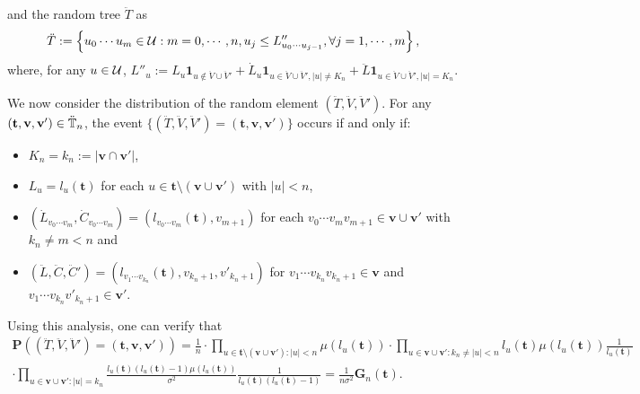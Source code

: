\documentclass[12pt]{amsart}
\theoremstyle{remark}
\numberwithin{equation}{section}
\newcommand{\ind}[1]{\mathbf 1_{#1}}
\newcommand{\prob}{\mathbf P}
\newcommand{\norm}[1]{\left\| #1 \right\|}
\newcommand{\abs}[1]{\left| #1 \right|}
\newcommand{\set}[1]{\left\{ #1 \right\}}
\newcommand{\tree}{\mathbf t}
\newcommand{\spine}{\mathbf v}
\newcommand{\bG}{\mathbf G}\newcommand{\bbG}{\mathbb G}\newcommand{\cG}{\mathcal G}
\begin{document}
and the random tree $\ddot T$ as
\begin{equation*}
	    \ddot T
	:=
          \set{u_0\cdots u_m\in\cU: m=0,\cdots,n,u_j\leq L''_{u_0\cdots u_{j-1}},\forall j=1,\cdots,m},
\end{equation*}
	where, for any $u\in\mathcal U$, $L''_u:=L_u \ind{u\not\in \ddot V\cup\ddot V'}+\dot L_u \ind{u\in \ddot V\cup\ddot V',|u|\neq K_n}+\ddot L\ind{u\in \ddot V\cup\ddot V',|u|=K_n}$.
\par
We now consider the distribution of the random element
$(\ddot T,\ddot V,\ddot V')$. For any $(\tree,\spine,\spine')\in\ddot\bbT_n$, 
the event $\{(\ddot T,\ddot V,\ddot V')=(\tree,\spine,\spine')\}$ 
occurs if and only if:
\begin{itemize}
\item
    $K_n=k_n:=|\spine\cap\spine'|$,
\item
    $L_u=l_u(\tree)$ for each $u\in \tree\setminus(\spine\cup\spine')$ with $\abs{u}<n$,
\item
    $(\dot L_{v_0\cdots v_m},\dot C_{v_0\cdots v_m})=(l_{v_0\cdots v_m}(\tree),v_{m+1})$ for each $v_0\cdots v_mv_{m+1}\in\spine\cup\spine'$
    with $k_n\neq m<n$ and
\item
    $(\ddot L,\ddot C,\ddot C')=(l_{v_1\cdots v_{k_n}}(\tree),v_{k_n+1},v'_{k_n+1})$ for $v_1\cdots v_{k_n}v_{k_n+1}\in\spine$ and $v_1\cdots v_{k_n}v'_{k_n+1}\in\spine'$.
\end{itemize}
Using this analysis, one can verify that
\begin{multline*}
		\prob\left((\ddot T,\ddot V,\ddot V')=(\tree,\spine,\spine')\right)
	=
		\frac{1}{n}
	\cdot
	    \prod_{u\in \tree\setminus(\spine\cup \spine'):|u|<n}
	    \mu(l_u(\tree))
	\cdot
    \prod_{u\in \spine\cup \spine':k_n\neq|u|<n}l_u(\tree)
    \mu(l_u(\tree))\frac{1}{l_u(\tree)}
    \\\cdot
		\prod_{u\in \spine\cup \spine':|u|=k_n}\frac{l_u(\tree)(l_u(\tree)-1)
		\mu(l_u(\tree))}{\sigma^2}\frac{1}{l_u(\tree)(l_u(\tree)-1)}
	=
		\frac{1}{n\sigma^2}\bG_n(\tree).
\end{multline*}
\end{document}
